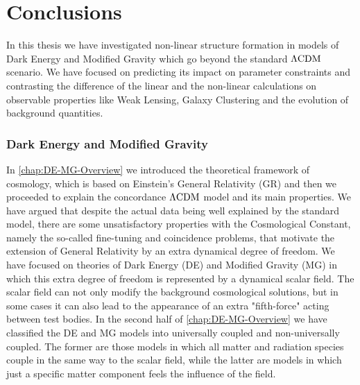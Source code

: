 \chapter*{Conclusions \label{Conclu}} %






In this thesis we have investigated non-linear structure formation in models of Dark Energy and Modified 
Gravity which go beyond the standard $\Lambda\mathrm{CDM}$ scenario. We have focused on predicting its impact
on parameter constraints and contrasting the difference of the linear and the non-linear calculations on observable properties like Weak Lensing, 
Galaxy Clustering and the evolution of background quantities.

\subsection*{Dark Energy and Modified Gravity}

In \cref{chap:DE-MG-Overview} we introduced the theoretical framework of cosmology, which is
based on Einstein's General Relativity (GR) and then we proceeded to explain the concordance $\Lambda\mathrm{CDM}$
model and its main properties. 
We have argued that despite the actual data being well explained by the standard model, 
there are some unsatisfactory properties with the Cosmological Constant, namely the so-called fine-tuning
and coincidence problems, that motivate the extension of General Relativity by an extra dynamical degree of freedom.
We have focused on theories of Dark Energy (DE) and Modified Gravity (MG) in which this extra degree of freedom  is represented by a dynamical scalar field. The scalar field can not 
only modify the background cosmological solutions,
but in some cases it can also lead to the appearance of an extra "fifth-force" acting between test bodies.
In the second half of \cref{chap:DE-MG-Overview} we have classified the DE and MG models into universally coupled  and non-universally coupled. The former are those models in which all matter and radiation species couple
in the same way to the scalar field, while the latter are models in which just a specific matter component feels the influence of the field. 

